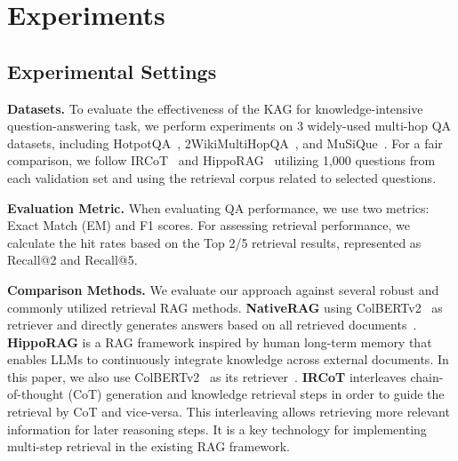 \documentclass{article}
\begin{document}
\section{Experiments}
\subsection{Experimental Settings}
\textbf{Datasets.}
To evaluate the effectiveness of the KAG for knowledge-intensive question-answering task, we perform experiments on 3 widely-used multi-hop QA datasets, including HotpotQA~\cite{hotpotqa}, 2WikiMultiHopQA~\cite{2wiki}, and MuSiQue~\cite{musique}. For a fair comparison, we follow IRCoT~\cite{trivedi2022interleaving} and HippoRAG~\cite{gutierrez2024hipporag} utilizing 1,000 questions from each validation set and using the retrieval corpus related to selected questions. 

\textbf{Evaluation Metric.}
When evaluating QA performance, we use two metrics: Exact Match (EM) and F1 scores. For assessing retrieval performance, we calculate the hit rates based on the Top 2/5 retrieval results, represented as Recall@2 and Recall@5.

\textbf{Comparison Methods.}
We evaluate our approach against several robust and commonly utilized retrieval RAG methods.
\textbf{NativeRAG} using ColBERTv2~\cite{ColBERTv2} as retriever and directly generates answers based on all retrieved documents~\cite{baserag}.
\textbf{HippoRAG} is a RAG framework inspired by human long-term memory that enables LLMs to continuously integrate knowledge across external documents. In this paper, we also use ColBERTv2~\cite{ColBERTv2} as its retriever~\cite{gutierrez2024hipporag}.
\textbf{IRCoT} interleaves chain-of-thought (CoT) generation and knowledge retrieval steps in order to guide the retrieval by CoT and vice-versa. This interleaving allows retrieving more relevant information for later reasoning steps.  It is a key technology for implementing multi-step retrieval in the existing RAG framework.
\end{document}
